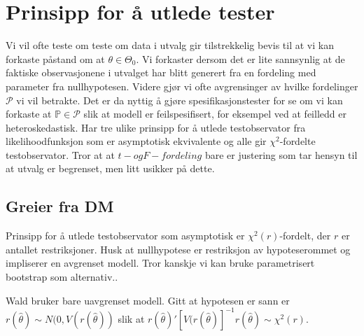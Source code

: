 \section{Prinsipp for å utlede tester}
Vi vil ofte teste om teste om data i utvalg gir tilstrekkelig bevis til at vi kan forkaste påstand om at $\theta \in \Theta_0$. Vi forkaster dersom det er lite sannsynlig at de faktiske observasjonene i utvalget har blitt generert fra en fordeling med parameter fra nullhypotesen. Videre gjør vi ofte avgrensinger av hvilke fordelinger $\mathscr{P}$ vi vil betrakte. Det er da nyttig å gjøre spesifikasjonstester for se om vi kan forkaste at $\mathbb{P} \in \mathscr{P}$ slik at modell er feilspesifisert, for eksempel ved at feilledd er heteroskedastisk. Har tre ulike prinsipp for å utlede testobservator fra likelihoodfunksjon som er asymptotisk ekvivalente og alle gir $\chi^2$-fordelte testobservator. Tror at at $t- og F-fordeling$ bare er justering som tar hensyn til at utvalg er begrenset, men litt usikker på dette. 
\subsection{Greier fra DM}
Prinsipp for å utlede testobservator som asymptotisk er $\chi^2(r)$-fordelt, der $r$ er antallet restriksjoner. Husk at nullhypotese er restriksjon av hypoteserommet og impliserer en avgrenset modell. Tror kanskje vi kan bruke parametrisert bootstrap som alternativ..

Wald bruker bare uavgrenset modell. Gitt at hypotesen er sann er $r(\hat{\theta})\sim N(0,V(r(\hat{\theta}))$ slik at $r(\hat{\theta})'[V(r(\hat{\theta})]^{-1}r(\hat{\theta}) \sim \chi^2(r)$.
